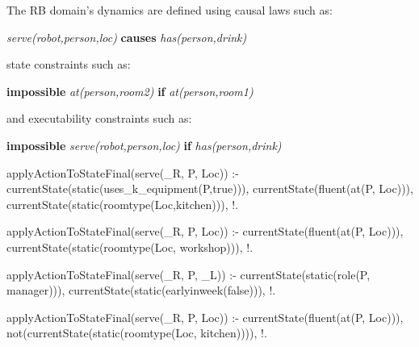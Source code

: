 

The RB domain's dynamics are defined using causal laws such as:

\textit{serve(robot,person,loc)} \textbf{causes} \textit{has(person,drink)}

state constraints such as:

\textbf{impossible} \textit{at(person,room2)} \textbf{if} \textit{at(person,room1)}

and executability constraints such as:

\textbf{impossible} \textit{serve(robot,person,loc)} \textbf{if} \textit{has(person,drink)}



applyActionToStateFinal(serve(_R, P, Loc)) :-
	currentState(static(uses_k_equipment(P,true))),
	currentState(fluent(at(P, Loc))),
	currentState(static(roomtype(Loc,kitchen))),
	!.
	
applyActionToStateFinal(serve(_R, P, Loc)) :-
	currentState(fluent(at(P, Loc))),
	currentState(static(roomtype(Loc, workshop))),
	!.
	
applyActionToStateFinal(serve(_R, P, _L)) :-
	currentState(static(role(P, manager))),
	currentState(static(earlyinweek(false))),
	!.
	
applyActionToStateFinal(serve(_R, P, Loc)) :-
	currentState(fluent(at(P, Loc))),
	not(currentState(static(roomtype(Loc, kitchen)))),
	!.
	

	